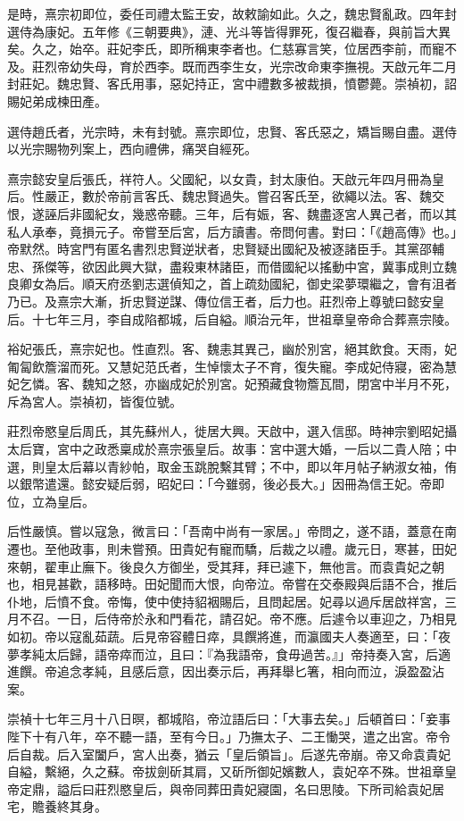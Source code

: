 是時，熹宗初即位，委任司禮太監王安，故敕諭如此。久之，魏忠賢亂政。四年封選侍為康妃。五年修《三朝要典》，漣、光斗等皆得罪死，復召繼春，與前旨大異矣。久之，始卒。莊妃李氏，即所稱東李者也。仁慈寡言笑，位居西李前，而寵不及。莊烈帝幼失母，育於西李。既而西李生女，光宗改命東李撫視。天啟元年二月封莊妃。魏忠賢、客氏用事，惡妃持正，宮中禮數多被裁損，憤鬱薨。崇禎初，詔賜妃弟成楝田產。

選侍趙氏者，光宗時，未有封號。熹宗即位，忠賢、客氏惡之，矯旨賜自盡。選侍以光宗賜物列案上，西向禮佛，痛哭自經死。

熹宗懿安皇后張氏，祥符人。父國紀，以女貴，封太康伯。天啟元年四月冊為皇后。性嚴正，數於帝前言客氏、魏忠賢過失。嘗召客氏至，欲繩以法。客、魏交恨，遂誣后非國紀女，幾惑帝聽。三年，后有娠，客、魏盡逐宮人異己者，而以其私人承奉，竟損元子。帝嘗至后宮，后方讀書。帝問何書。對曰：「《趙高傳》也。」帝默然。時宮門有匿名書烈忠賢逆狀者，忠賢疑出國紀及被逐諸臣手。其黨邵輔忠、孫傑等，欲因此興大獄，盡殺東林諸臣，而借國紀以搖動中宮，冀事成則立魏良卿女為后。順天府丞劉志選偵知之，首上疏劾國紀，御史梁夢環繼之，會有沮者乃已。及熹宗大漸，折忠賢逆謀、傳位信王者，后力也。莊烈帝上尊號曰懿安皇后。十七年三月，李自成陷都城，后自縊。順治元年，世祖章皇帝命合葬熹宗陵。

裕妃張氏，熹宗妃也。性直烈。客、魏恚其異己，幽於別宮，絕其飲食。天雨，妃匍匐飲簷溜而死。又慧妃范氏者，生悼懷太子不育，復失寵。李成妃侍寢，密為慧妃乞憐。客、魏知之怒，亦幽成妃於別宮。妃預藏食物簷瓦間，閉宮中半月不死，斥為宮人。崇禎初，皆復位號。

莊烈帝愍皇后周氏，其先蘇州人，徙居大興。天啟中，選入信邸。時神宗劉昭妃攝太后寶，宮中之政悉稟成於熹宗張皇后。故事：宮中選大婚，一后以二貴人陪；中選，則皇太后幕以青紗帕，取金玉跳脫繫其臂；不中，即以年月帖子納淑女袖，侑以銀幣遣還。懿安疑后弱，昭妃曰：「今雖弱，後必長大。」因冊為信王妃。帝即位，立為皇后。

后性嚴慎。嘗以寇急，微言曰：「吾南中尚有一家居。」帝問之，遂不語，蓋意在南遷也。至他政事，則未嘗預。田貴妃有寵而驕，后裁之以禮。歲元日，寒甚，田妃來朝，翟車止廡下。後良久方御坐，受其拜，拜已遽下，無他言。而袁貴妃之朝也，相見甚歡，語移時。田妃聞而大恨，向帝泣。帝嘗在交泰殿與后語不合，推后仆地，后憤不食。帝悔，使中使持貂裀賜后，且問起居。妃尋以過斥居啟祥宮，三月不召。一日，后侍帝於永和門看花，請召妃。帝不應。后遽令以車迎之，乃相見如初。帝以寇亂茹蔬。后見帝容體日瘁，具饌將進，而瀛國夫人奏適至，曰：「夜夢孝純太后歸，語帝瘁而泣，且曰：『為我語帝，食毋過苦。』」帝持奏入宮，后適進饌。帝追念孝純，且感后意，因出奏示后，再拜舉匕箸，相向而泣，淚盈盈沾案。

崇禎十七年三月十八日暝，都城陷，帝泣語后曰：「大事去矣。」后頓首曰：「妾事陛下十有八年，卒不聽一語，至有今日。」乃撫太子、二王慟哭，遣之出宮。帝令后自裁。后入室闔戶，宮人出奏，猶云「皇后領旨」。后遂先帝崩。帝又命袁貴妃自縊，繫絕，久之蘇。帝拔劍斫其肩，又斫所御妃嬪數人，袁妃卒不殊。世祖章皇帝定鼎，謚后曰莊烈愍皇后，與帝同葬田貴妃寢園，名曰思陵。下所司給袁妃居宅，贍養終其身。

